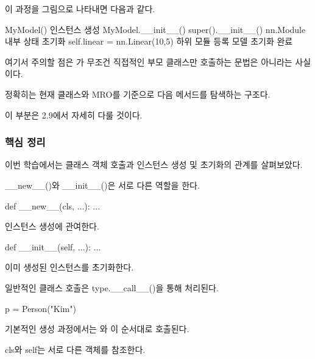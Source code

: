 이 과정을 그림으로 나타내면 다음과 같다.

\begin{dhksmry}[centered]
MyModel()
\da
인스턴스 생성
\da
MyModel.__init__()
\da
super().__init__()
\da
nn.Module 내부 상태 초기화
\da
self.linear = nn.Linear(10,5)
\da
하위 모듈 등록
\da
모델 초기화 완료
\end{dhksmry}

여기서 주의할 점은 가 무조건 직접적인 부모 클래스만 호출하는 문법은 아니라는 사실이다.

정확히는 현재 클래스와 MRO를 기준으로 다음 메서드를 탐색하는 구조다.

이 부분은 2.9에서 자세히 다룰 것이다.

\subsubsection{핵심 정리}

이번 학습에서는 클래스 객체 호출과 인스턴스 생성 및 초기화의 관계를 살펴보았다.

\begin{dhknote}
\begin{dhksmry}[centered]
__new__()와 __init__()은 서로 다른 역할을 한다.
\end{dhksmry}
\end{dhknote}

\begin{dhkcode}
def __new__(cls, ...):
    ...
\end{dhkcode}

인스턴스 생성에 관여한다.

\begin{dhkcode}
def __init__(self, ...):
    ...
\end{dhkcode}

이미 생성된 인스턴스를 초기화한다.

\begin{dhknote}
\begin{dhksmry}[centered]
일반적인 클래스 호출은 type.__call__()을 통해 처리된다.
\end{dhksmry}
\end{dhknote}

\begin{dhkcode}
p = Person("Kim")
\end{dhkcode}

기본적인 생성 과정에서는 와 이 순서대로 호출된다.

\begin{dhknote}
\begin{dhksmry}[centered]
cls와 self는 서로 다른 객체를 참조한다.
\end{dhksmry}
\end{dhknote}

